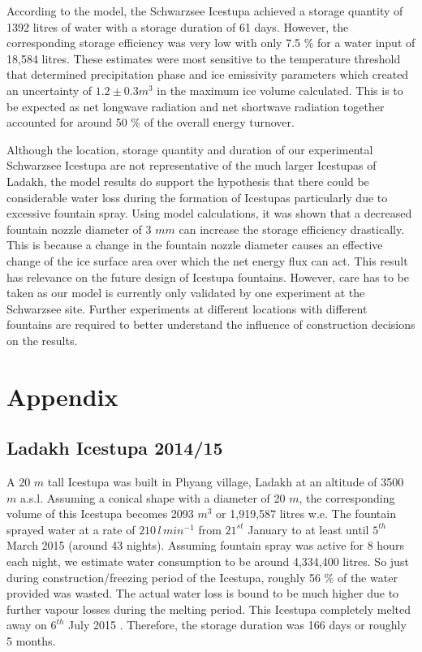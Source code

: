 \documentclass[utf8]{frontiersSCNS} %
\begin{document}
According to the model, the Schwarzsee Icestupa achieved a storage quantity of 1392 litres of water with a storage
duration of 61 days. However, the corresponding storage efficiency was very low with only 7.5 \% for a water input of
18,584 litres. These estimates were most sensitive to the temperature threshold that determined precipitation phase
and ice emissivity parameters which created an uncertainty of $1.2 \pm 0.3 m^3$ in the maximum ice volume calculated.
This is to be expected as net longwave radiation and net shortwave radiation together accounted for around 50 \% of
the overall energy turnover.

Although the location, storage quantity and duration of our experimental Schwarzsee Icestupa are not representative of
the much larger Icestupas of Ladakh, the model results do support the hypothesis that there could be considerable
water loss during the formation of Icestupas particularly due to excessive fountain spray. Using model calculations,
it was shown that a decreased fountain nozzle diameter of 3 $mm$ can increase the storage efficiency drastically. This
is because a change in the fountain nozzle diameter causes an effective change of the ice surface area over which the
net energy flux can act. This result has relevance on the future design of Icestupa fountains. However, care has to be
taken as our model is currently only validated by one experiment at the Schwarzsee site. Further experiments at
different locations with different fountains are required to better understand the influence of construction decisions
on the results. 



\section{Appendix}

\subsection{Ladakh Icestupa 2014/15} \label{section:ladakhloss} A 20 $m$ tall Icestupa \citep{iceheight} was built in
Phyang village, Ladakh at an altitude of 3500 $m$ a.s.l. Assuming a conical shape with a diameter of 20 $m$, the
corresponding volume of this Icestupa becomes 2093 $m^3$ or 1,919,587 litres w.e. The fountain sprayed water at a rate
of $210\, l\,min^{-1}$ \citep{waterinput} from $21^{st}$ January \citep{waterstart} to at least until $5^{th}$ March
2015 \citep{waterend} (around 43 nights). Assuming fountain spray was active for 8 hours each night, we estimate water
consumption to be around 4,334,400 litres. So just during construction/freezing period of the Icestupa, roughly 56 \%
of the water provided was wasted. The actual water loss is bound to be much higher due to further vapour losses during
the melting period. This Icestupa completely melted away on $6^{th}$ July 2015 \citep{iceends}. Therefore, the storage
duration was 166 days or roughly 5 months. 
\end{document}
